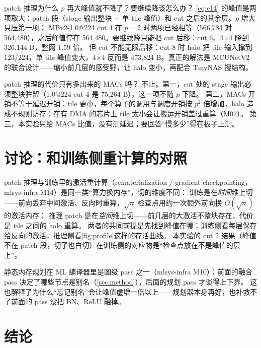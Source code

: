\documentclass[11pt,a4paper]{ctexart}
\begin{document}
\begin{iqbox}{patch 推理为什么 $p$ 再大峰值就不降了？要继续降该怎么办？}
\cref{eq:e14} 的峰值是两项取大：patch 段（stage 输出整块 + 单 tile 峰值）和 cut 之后的其余层。$p$ 增大只压第一项；
MBv2-1.0@224 cut 4 在 $p=2$ 时两项已经相等（566,784 对 564,480），之后峰值停在 564,480。要继续降只能把 cut 后移：cut 6、4×4 降到 326,144 B，整网 1.59 倍。
但 cut 不能无限后移：cut 8 时 halo 把 tile 输入撑到 123/224，单 tile 峰值变大，4×4 反而是 473,824 B。真正的解法是 MCUNetV2 的联合设计——缩小前几层的感受野，让 halo 变小，再配合 TinyNAS 搜结构。
\end{iqbox}

\begin{iqbox}{patch 推理的代价只有多出来的 MACs 吗？}
不止。第一，cut 处的 stage 输出必须整块驻留（1.0@224 cut 4 是 75,264 B），这一项不随 $p$ 下降。
第二，MACs 开销不等于延迟开销：tile 更小，每个算子的调用与调度开销按 $p^2$ 倍增加，halo 造成不规则访存；在有 DMA 的芯片上 tile 太小会让搬运开销盖过重算（M07）。
第三，本实验只给 MACs 比值，没有测延迟；要回答“慢多少”得在板子上测。
\end{iqbox}

\section{讨论：和训练侧重计算的对照}\label{sec:discussion}
patch 推理与训练里的激活重计算（rematerialization / gradient checkpointing，mlsys-infra M14）是同一类“算力换内存”，切的维度不同：
训练是在\emph{时间}维上切——前向丢弃中间激活、反向时重算，$\sqrt{n}$ 检查点用约一次额外前向换 $O(\sqrt{n})$ 的激活内存；
推理 patch 是在\emph{空间}维上切——前几层的大激活不整块存在，代价是 tile 之间的 halo 重算。
两者的共同前提是先找到峰值在哪：训练侧看每层保存给反向的激活，推理侧看\cref{fig:profile}这样的存活曲线。
本实验的 cut 2 结果（峰值不在 patch 段，切了也白切）在训练侧的对应物是“检查点放在不是峰值的层上”。

静态内存规划在 ML 编译器里是图级 pass 之一（mlsys-infra M10）：前面的融合 pass 决定了哪些节点是别名（\cref{sec:method}），后面的规划 pass 才谈得上下界。
这也解释了为什么“忘记别名”会让峰值虚增一倍以上——规划器本身再好，也补救不了前面的 pass 没把 BN、ReLU 融掉。

\section{结论}
\end{document}
